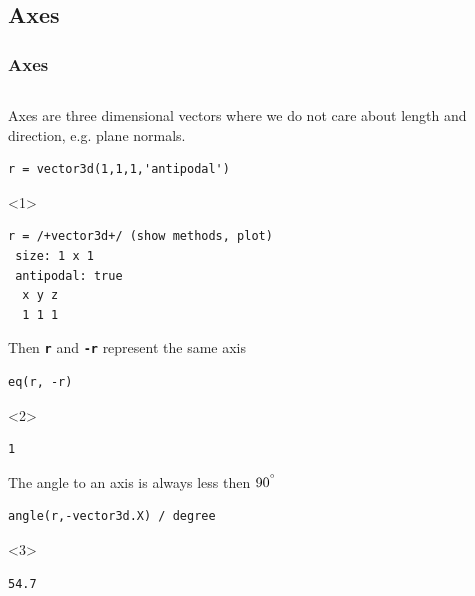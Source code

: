 \documentclass[compress]{beamer}
\begin{document}


\subsection*{Axes}

\begin{frame}[fragile]
  \frametitle{Axes}

  \begin{columns}
    \begin{column}{8.5cm}
      \begin{overlayarea}{8.5cm}{8cm}
        Axes are three dimensional vectors where we do not care about length and
        direction, e.g. plane normals.

\begin{lstlisting}[style=input]
r = vector3d(1,1,1,'antipodal')
\end{lstlisting}
\begin{onlyenv}<1>
  \vspace{-0.3cm}
\begin{lstlisting}[style=output]
r = /+vector3d+/ (show methods, plot)
 size: 1 x 1
 antipodal: true
  x y z
  1 1 1
\end{lstlisting}
\end{onlyenv}

\medskip
\pause

Then \textbf{\texttt{r}} and \textbf{\texttt{-r}} represent the same axis
\begin{lstlisting}[style=input]
eq(r, -r)
\end{lstlisting}
\begin{onlyenv}<2>
  \vspace{-0.3cm}
\begin{lstlisting}[style=output]
  1
\end{lstlisting}
\end{onlyenv}

\medskip
\pause

The angle to an axis is always less then $90^{^\circ}$
\begin{lstlisting}[style=input]
angle(r,-vector3d.X) / degree
\end{lstlisting}
\begin{onlyenv}<3>
  \vspace{-0.3cm}
\begin{lstlisting}[style=output]
  54.7
\end{lstlisting}
\end{onlyenv}


\end{overlayarea}
\end{column}
\end{columns}
\end{frame}
\end{document}
